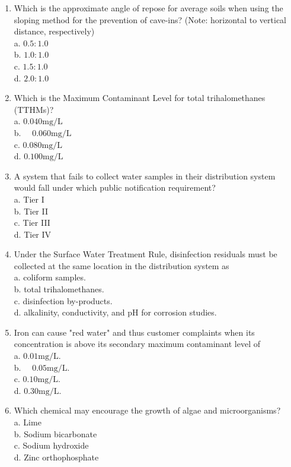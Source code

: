\documentclass[10pt]{article}
\begin{document}
\begin{enumerate}
  \item Which is the approximate angle of repose for average soils when using the sloping method for the prevention of cave-ins? (Note: horizontal to vertical distance, respectively)\\
a. $0.5: 1.0$\\
b. $1.0: 1.0$\\
c. $1.5: 1.0$\\
d. $2.0: 1.0$

  \item Which is the Maximum Contaminant Level for total trihalomethanes (TTHMs)?\\
a. $0.040 \mathrm{mg} / \mathrm{L}$\\
b. $\quad 0.060 \mathrm{mg} / \mathrm{L}$\\
c. $0.080 \mathrm{mg} / \mathrm{L}$\\
d. $0.100 \mathrm{mg} / \mathrm{L}$ 

\item A system that fails to collect water samples in their distribution system would fall under which public notification requirement?\\
a. Tier I\\
b. Tier II\\
c. Tier III\\
d. Tier IV

  \item Under the Surface Water Treatment Rule, disinfection residuals must be collected at the same location in the distribution system as\\
a. coliform samples.\\
b. total trihalomethanes.\\
c. disinfection by-products.\\
d. alkalinity, conductivity, and $\mathrm{pH}$ for corrosion studies.

  \item Iron can cause "red water" and thus customer complaints when its concentration is above its secondary maximum contaminant level of\\
a. $0.01 \mathrm{mg} / \mathrm{L}$.\\
b. $\quad 0.05 \mathrm{mg} / \mathrm{L}$.\\
c. $0.10 \mathrm{mg} / \mathrm{L}$.\\
d. $0.30 \mathrm{mg} / \mathrm{L}$.

  \item Which chemical may encourage the growth of algae and microorganisms?\\
a. Lime\\
b. Sodium bicarbonate\\
c. Sodium hydroxide\\
d. Zinc orthophosphate


\end{enumerate}
\end{document}
